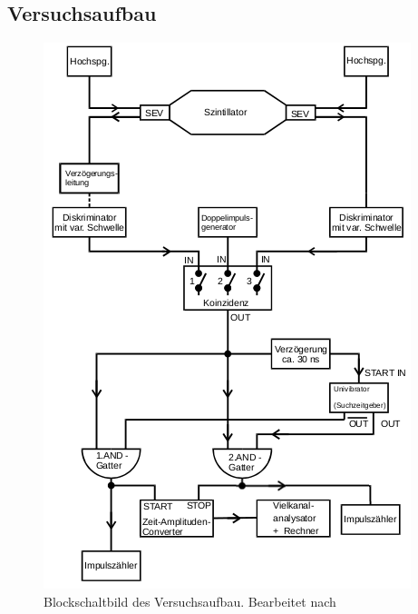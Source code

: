 \subsection{Versuchsaufbau}
\label{sec:Versuchsaufbau}
\begin{figure}
  \centering
  \includegraphics[width=0.75\columnwidth]{pictures/aufbau.png}
  \caption{Blockschaltbild des Versuchsaufbau. Bearbeitet nach \cite{Anleitung}}
  \label{fig:aufbau}
\end{figure}
